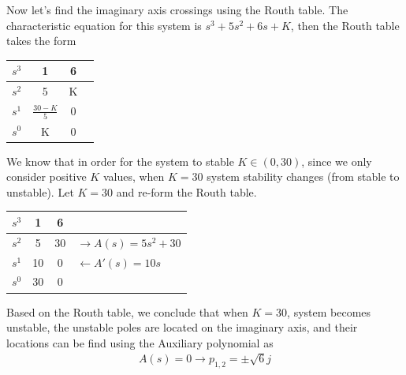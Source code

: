 \documentclass[twoside]{article}
\begin{document}
\begin{enumerate}
\vspace{12pt}

Now let's find the imaginary axis crossings using the Routh table. 
The characteristic equation for this system is $s^3 + 5 s^2 + 6 s +
K$, then the Routh table takes the form

\vspace{6pt}
\begin{minipage}[h]{1\linewidth}
\begin{center}
\begin{tabular}{|c || c || c | l |}
\hline
$s^3$ & 1 & 6 & 
\\ \hline
$s^2$ & 5 & K & 
\\ \hline
$s^1$ & $\frac{30 - K}{5}$ & 0 & 
\\ \hline
$s^0$ & K & 0 &
\\ \hline
\end{tabular}
\end{center}
\end{minipage}
\vspace{6pt}

We know that in order for the system to stable $K \in (0 , 30)$,
since we only consider positive $K$ values, when $K = 30$
system stability changes (from stable to unstable). Let $K=30$
and re-form the Routh table. 

\vspace{6pt}
\begin{minipage}[h]{1\linewidth}
\begin{center}
\begin{tabular}{|c || c || c | l |}
\hline
$s^3$ & 1 & 6 & 
\\ \hline
$s^2$ & 5 & 30 & $\rightarrow A(s) = 5 s^2 + 30$
\\ \hline
$s^1$ & 10 & 0 &  $\leftarrow A'(s) = 10 s $
\\ \hline
$s^0$ & 30 & 0 &
\\ \hline
\end{tabular}
\end{center}
\end{minipage}
\vspace{6pt}

Based on the Routh table, we conclude that when $K = 30$, system
becomes unstable, the unstable poles are located on the imaginary
axis, and their locations can be find using the Auxiliary polynomial 
as
%
\begin{align*}
A(s) = 0 \rightarrow p_{1,2} = \pm \sqrt{6} j
\end{align*}
%


\end{enumerate}
\end{document}
